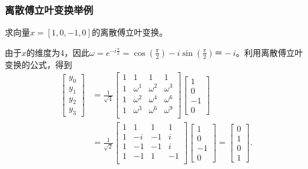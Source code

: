 \documentclass[10pt]{beamer}
\begin{document}
\begin{frame}
\frametitle{离散傅立叶变换举例}
\begin{example}
求向量$x = [1,0,-1,0]$的离散傅立叶变换。
\end{example}
由于$x$的维度为4，因此$\omega = e^{-i \frac{\pi}{2}} = \cos(\frac{\pi}{2}) - i \sin(\frac{\pi}{2}) ＝ -i$。利用离散傅立叶变换的公式，得到
\begin{align*}
\left[ \begin{array}{c}
     y_0 \\ y_1 \\y_2  \\ y_{3}  \end{array} \right]
&= \frac{1}{\sqrt{4}} \left[ \begin{array}{cccc}
     1    & 1 & 1  & 1  \\
     1    &  \omega^1 &  \omega^2 &  \omega^{3}  \\
     1    &  \omega^2 &  \omega^4 & \omega^{6}  \\
     1    &  \omega^3 &  \omega^6 & \omega^{9}  \\                 
            \end{array} \right] 
\left[ \begin{array}{c}
     1 \\ 0 \\ -1 \\ 0  \end{array} \right] \nonumber \\
&= \frac{1}{\sqrt{2}} \left[ \begin{array}{cccc}
     1    & 1 & 1  & 1  \\
     1    &  -i &  -1 &  i \\
     1    & -1 &  -1 & i  \\
     1    & -1 & 1  & -1  \\                 
            \end{array} \right] 
\left[ \begin{array}{c}
     1 \\ 0 \\ -1 \\ 0  \end{array} \right] 
= \left[ \begin{array}{c}
     0 \\ 1 \\ 0 \\ 1  \end{array} \right]  .
\end{align*}
\end{frame}
\end{document}
